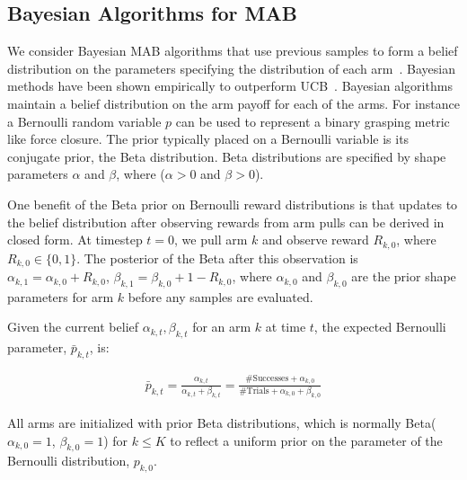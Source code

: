 \documentclass[10pt, conference]{ieeeconf}      %
\begin{document}
\subsection{Bayesian Algorithms for MAB}\label{sec:bandit_algorithm}
We consider Bayesian MAB algorithms that use previous samples to form a belief distribution on the parameters specifying the distribution of each arm~\cite{agrawal2011analysis,weber1992gittins}.  Bayesian methods have been shown empirically to outperform UCB~\cite{chapelle2011empirical, bachman2013greedy}. Bayesian algorithms maintain a belief distribution on the arm payoff for each of the arms. For instance a Bernoulli random variable $p$ can be used to represent a binary grasping metric like force closure. The prior typically placed on a Bernoulli variable is its conjugate prior, the Beta distribution.
Beta distributions are specified by shape parameters $\alpha$ and $\beta$, where ($\alpha >0$ and $\beta >0$).


One benefit of the Beta prior on Bernoulli reward distributions is that updates to the belief distribution after observing rewards from arm pulls can be derived in closed form.
At timestep $t=0$, we pull arm $k$ and observe reward $R_{k,0}$, where $R_{k,0} \in \lbrace 0, 1\rbrace$.
The posterior of the Beta after this observation is $\alpha_{k, 1} = \alpha_{k, 0} + R_{k,0}$,  $\beta_{k, 1} = \beta_{k, 0} + 1-R_{k,0}$, where $\alpha_{k,0}$ and $\beta_{k,0}$ are the prior shape parameters for arm $k$ before any samples are evaluated.

Given the current belief $\alpha_{k, t}, \beta_{k, t}$ for an arm $k$ at time $t$, the expected Bernoulli parameter, $\bar{p}_{k,t}$, is:

\vspace{-2ex}
\begin{align}\label{eq:shape_sampling}
\bar{p}_{k,t} = \frac{\alpha_{k,t}}{\alpha_{k,t} + \beta_{k,t}} = \frac{\mbox{\#Successes} + \alpha_{k,0}}{\mbox{\#Trials}+\alpha_{k,0}+\beta_{k,0}}
\end{align}

All arms are initialized with prior Beta distributions, which is normally Beta($\alpha_{k,0}=1$,  $\beta_{k,0} =1$) for $k\leq K$ to reflect a uniform prior on the parameter of the Bernoulli distribution, $p_{k,0}$.

\end{document}
